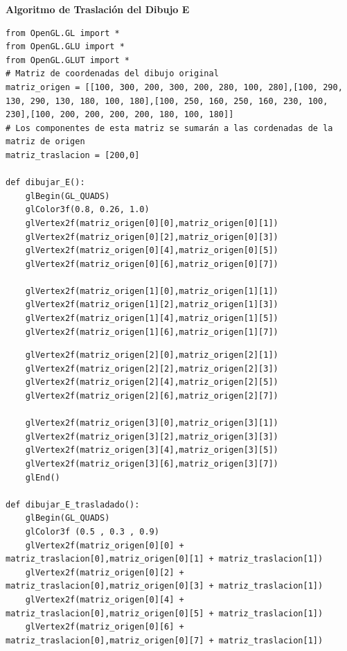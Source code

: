 \documentclass[a4paper]{article}
\begin{document}
\Large{\textbf{Algoritmo de Traslación del Dibujo E}}\\[-0.5cm]
\begin{center}
\begin{mycodeboxl}
\begin{lstlisting}
from OpenGL.GL import *
from OpenGL.GLU import *
from OpenGL.GLUT import *
# Matriz de coordenadas del dibujo original
matriz_origen = [[100, 300, 200, 300, 200, 280, 100, 280],[100, 290, 130, 290, 130, 180, 100, 180],[100, 250, 160, 250, 160, 230, 100, 230],[100, 200, 200, 200, 200, 180, 100, 180]]
# Los componentes de esta matriz se sumarán a las cordenadas de la matriz de origen
matriz_traslacion = [200,0]

def dibujar_E():
    glBegin(GL_QUADS)
    glColor3f(0.8, 0.26, 1.0)
    glVertex2f(matriz_origen[0][0],matriz_origen[0][1])
    glVertex2f(matriz_origen[0][2],matriz_origen[0][3])
    glVertex2f(matriz_origen[0][4],matriz_origen[0][5])
    glVertex2f(matriz_origen[0][6],matriz_origen[0][7])

    glVertex2f(matriz_origen[1][0],matriz_origen[1][1])
    glVertex2f(matriz_origen[1][2],matriz_origen[1][3])
    glVertex2f(matriz_origen[1][4],matriz_origen[1][5])
    glVertex2f(matriz_origen[1][6],matriz_origen[1][7])
\end{lstlisting}
\end{mycodeboxl}
\end{center}
\newpage

\begin{center}
\begin{mycodeboxl}
\begin{lstlisting}
    glVertex2f(matriz_origen[2][0],matriz_origen[2][1])
    glVertex2f(matriz_origen[2][2],matriz_origen[2][3])
    glVertex2f(matriz_origen[2][4],matriz_origen[2][5])
    glVertex2f(matriz_origen[2][6],matriz_origen[2][7])

    glVertex2f(matriz_origen[3][0],matriz_origen[3][1])
    glVertex2f(matriz_origen[3][2],matriz_origen[3][3])
    glVertex2f(matriz_origen[3][4],matriz_origen[3][5])
    glVertex2f(matriz_origen[3][6],matriz_origen[3][7])
    glEnd()

def dibujar_E_trasladado():
    glBegin(GL_QUADS)
    glColor3f (0.5 , 0.3 , 0.9)
    glVertex2f(matriz_origen[0][0] + matriz_traslacion[0],matriz_origen[0][1] + matriz_traslacion[1])
    glVertex2f(matriz_origen[0][2] + matriz_traslacion[0],matriz_origen[0][3] + matriz_traslacion[1])
    glVertex2f(matriz_origen[0][4] + matriz_traslacion[0],matriz_origen[0][5] + matriz_traslacion[1])
    glVertex2f(matriz_origen[0][6] + matriz_traslacion[0],matriz_origen[0][7] + matriz_traslacion[1])
\end{lstlisting}
\end{mycodeboxl}
\end{center}
\newpage
\end{document}
